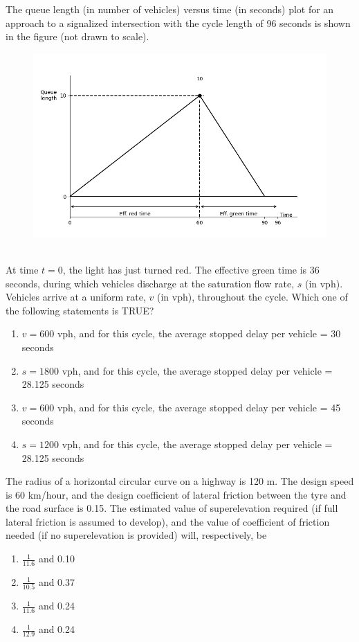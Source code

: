 \item The queue length (in number of vehicles) versus time (in seconds) plot for an approach to a signalized intersection with the cycle length of 96 seconds is shown in the figure (not drawn to scale).
\begin{figure}[h!]
    \centering
    \includegraphics[width=0.5\linewidth]{GATE-yearwise/2017/figs/figure.png}
    \label{fig:enter-label}
\end{figure}\\
At time $t=0$, the light has just turned red. The effective green time is 36 seconds, during which vehicles discharge at the saturation flow rate, $s$ (in vph). Vehicles arrive at a uniform rate, $v$ (in vph), throughout the cycle. Which one of the following statements is TRUE?
\begin{multicols}{2}
    \begin{enumerate}
        \item $v = 600$ vph, and for this cycle, the average stopped delay per vehicle = 30 seconds 
        \item $s = 1800$ vph, and for this cycle, the average stopped delay per vehicle = 28.125 seconds 
        \item $v = 600$ vph, and for this cycle, the average stopped delay per vehicle = 45 seconds 
        \item $s = 1200$ vph, and for this cycle, the average stopped delay per vehicle = 28.125 seconds
    \end{enumerate}
\end{multicols}

\item The radius of a horizontal circular curve on a highway is 120 m. The design speed is 60 km/hour, and the design coefficient of lateral friction between the tyre and the road surface is 0.15. The estimated value of superelevation required (if full lateral friction is assumed to develop), and the value of coefficient of friction needed (if no superelevation is provided) will, respectively, be
\begin{multicols}{2}
    \begin{enumerate}
        \item $\frac{1}{11.6}$ and 0.10
        \item $\frac{1}{10.5}$ and 0.37
        \item $\frac{1}{11.6}$ and 0.24
        \item $\frac{1}{12.9}$ and 0.24
    \end{enumerate}
\end{multicols}

